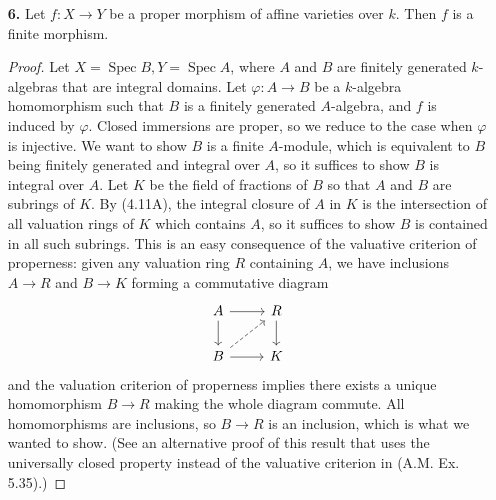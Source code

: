 \documentclass{article}
\newcommand{\goth}[1]{\textfrak{#1}}
\DeclareMathOperator{\spec}{Spec}
\begin{document}
\begin{enumerate} [label=\textbf{\arabic*.}, leftmargin=0em]
\begin{proof}
    \begin{itemize}
        \item[(a)] Let $k$ be a field, let $X = \spec{k[\varepsilon]/(\varepsilon^2)}$ (Ex. 2.8), and let $Y$ be any scheme over $k$. Giving a $k$-morphism $X \to Y$ is equivalent to giving a point in $y \in Y$ rational over $k$, and an element of $\goth{m}_y / \goth{m}_y^2$.
        \item[(b)] Let $X$ be the affine line, and let $Y$ be the affine line with the origin doubled. We have two possible open immersions of $X$ into $Y$ with each one having either origin in its image, and the open immersions agree on the complement of the origin of $X$, which is an open dense subset of $X$.
    \end{itemize}
\end{proof}

\newpage

\item[\textbf{6.}] Let $f : X \to Y$ be a proper morphism of affine varieties over $k$. Then $f$ is a finite morphism.

\begin{proof}
    Let $X = \spec{B}, Y = \spec{A}$, where $A$ and $B$ are finitely generated $k$-algebras that are integral domains. Let $\varphi : A \to B$ be a $k$-algebra homomorphism such that $B$ is a finitely generated $A$-algebra, and $f$ is induced by $\varphi$. Closed immersions are proper, so we reduce to the case when $\varphi$ is injective. We want to show $B$ is a finite $A$-module, which is equivalent to $B$ being finitely generated and integral over $A$, so it suffices to show $B$ is integral over $A$. Let $K$ be the field of fractions of $B$ so that $A$ and $B$ are subrings of $K$. By (4.11A), the integral closure of $A$ in $K$ is the intersection of all valuation rings of $K$ which contains $A$, so it suffices to show $B$ is contained in all such subrings. This is an easy consequence of the valuative criterion of properness: given any valuation ring $R$ containing $A$, we have inclusions $A \to R$ and $B \to K$ forming a commutative diagram
    \[\begin{tikzcd}
        A \arrow[d] \arrow[r]          & R \arrow[d] \\
        B \arrow[r] \arrow[ru, dashed] & K          
        \end{tikzcd} \]
    and the valuation criterion of properness implies there exists a unique homomorphism $B \to R$ making the whole diagram commute. All homomorphisms are inclusions, so $B \to R$ is an inclusion, which is what we wanted to show. (See an alternative proof of this result that uses the universally closed property instead of the valuative criterion in (A.M. Ex. 5.35).)
\end{proof}


\end{enumerate}
\end{document}
